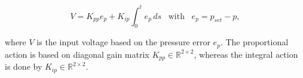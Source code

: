 \begin{equation}
    V = K_{pp}e_p + K_{ip} \int_0^t e_p \hspace{2pt} ds \hspace{10pt} \text{with} \hspace{10pt} e_p = p_{set} - p,
\end{equation}

where $V$ is the input voltage based on the pressure error $e_p$. The proportional action is based on diagonal gain matrix $K_{pp} \in \mathbb{R}^{2\times 2}$, whereas the integral action is done by $K_{ip} \in \mathbb{R}^{2\times 2}$.





















































